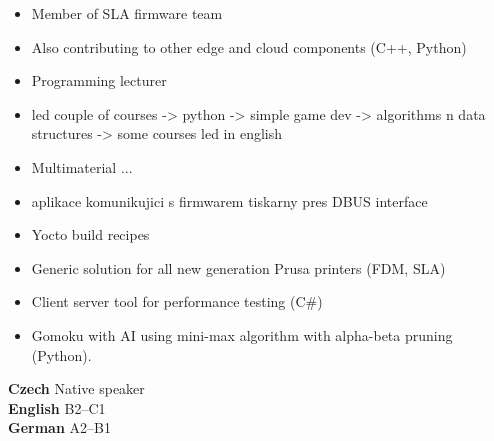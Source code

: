 

\begin{itemize}
\item Member of SLA firmware team
\item Also contributing to other edge and cloud components (C++, Python)
\end{itemize}

\vspace{10px}


\begin{itemize}
\item Programming lecturer
\item led couple of courses
	-> python
	-> simple game dev
	-> algorithms n data structures
	-> some courses led in english
\end{itemize}

\vspace{8px}



\begin{itemize}
\item Multimaterial ...
\end{itemize}

\vspace{4px}


\begin{itemize}
\item aplikace komunikujici s firmwarem tiskarny pres DBUS interface
\item Yocto build recipes
\item Generic solution for all new generation Prusa printers (FDM, SLA)
\end{itemize}

\vspace{4px}


\vspace{4px}

\vspace{4px}

\begin{itemize}
\item Client server tool for performance testing (C\#) 
\item Gomoku with AI using mini-max algorithm with alpha-beta pruning (Python).
\end{itemize}

\vspace{8px}

\textbf{ Czech} \hfill Native speaker \\
\textbf{ English} \hfill B2--C1 \\
\textbf{ German} \hfill A2--B1

